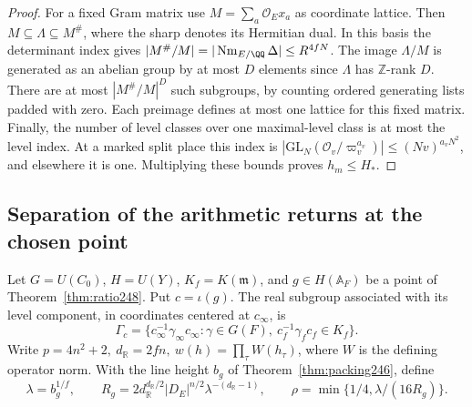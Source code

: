 \documentclass[a4paper,11pt]{article}
\theoremstyle{definition}
\theoremstyle{remark}
\newcommand{\ZZ}{\mathbb Z}\newcommand{\ord}{\operatorname{ord}}
\numberwithin{equation}{section}
\begin{document}
\begin{proof}
For a fixed Gram matrix use \(M=\sum_a\mathcal O_E x_a\) as
coordinate lattice. Then \(M\subseteq\Lambda\subseteq M^\#\),
where the sharp denotes its Hermitian dual. In this basis the
determinant index gives
\(|M^\#/M|=|\operatorname{Nm}_{E/\QQ}\Delta|\le R^{4fN}\).
The image \(\Lambda/M\) is generated as an abelian group by
at most \(D\) elements since \(\Lambda\) has \(\ZZ\)-rank \(D\).
There are at most \(|M^\#/M|^D\) such subgroups, by counting
ordered generating lists padded with zero. Each preimage
defines at most one lattice for this fixed matrix. Finally,
the number of level classes over one maximal-level class
is at most the level index. At a marked split place this index
is \(|\mathrm{GL}_N(\mathcal O_v/\varpi_v^{a_v})|
\le (Nv)^{a_vN^2}\), and elsewhere it is one. Multiplying
these bounds proves \(h_m\le H_*\).
\end{proof}

\subsection{Separation of the arithmetic returns at the chosen point}\label{nav:IX-39}
Let \(G=U(C_0)\), \(H=U(Y)\), \(K_f=K(\mathfrak m)\), and
\(g\in H(\mathbb A_F)\) be a point of
Theorem~\ref{thm:ratio248}. Put \(c=\iota(g)\). The real
subgroup associated with its level component, in coordinates
centered at \(c_\infty\), is
\[
 \Gamma_c=
 \{c_\infty^{-1}\gamma_\infty c_\infty:
             \gamma\in G(F),\ c_f^{-1}\gamma_fc_f\in K_f\}.
\]
Write \(p=4n^2+2,\ d_{\mathbb R}=2fn,\ w(h)=\prod_\tau W(h_\tau)\),
where \(W\) is the defining operator norm. With the line height
\(b_g\) of Theorem~\ref{thm:packing246}, define
\[
 \lambda=b_g^{1/f},\qquad
 R_g=2d_{\mathbb R}^{d_{\mathbb R}/2}|D_E|^{n/2}
                         \lambda^{-(d_{\mathbb R}-1)},\qquad
 \rho=\min\{1/4,\lambda/(16 R_g)\}.
\]
\end{document}
